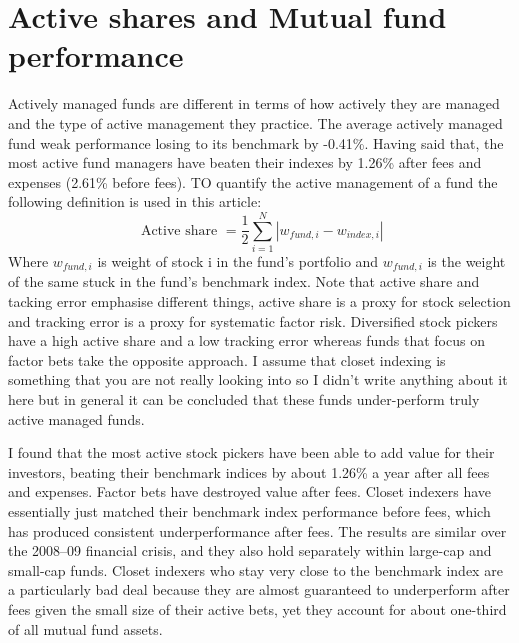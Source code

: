 \documentclass[12 pt]{article}
\begin{document}
\section{Active shares and Mutual fund performance}
Actively managed funds are different in terms of how actively they are managed and the type of active management they practice. The average actively managed fund weak performance losing to its benchmark by -0.41\%. Having said that, the most active fund managers have beaten their indexes by 1.26\% after fees and expenses (2.61\% before fees). TO quantify the active management of a fund the following definition is used in this article: 
\[
\text{ Active share } = \frac{1}{2}\sum_{i=1}^N\left|w_{fund, i}-w_{index, i}\right|
\]
Where $w_{fund, i}$ is weight of stock i in the fund's portfolio and $w_{fund, i}$ is the weight of the same stuck in the fund's benchmark index.
Note that active share and tacking error emphasise different things, active share is a proxy for stock selection and tracking error is a proxy for systematic factor risk. Diversified stock pickers have a high active share and a low tracking error whereas funds that focus on factor bets take the opposite approach. 	I assume that closet indexing is something that you are not really looking into so I didn't write anything about it here but in general it can be concluded that these funds under-perform truly active managed funds. 
\par I found that the most active stock pickers have been able to add value for their investors, beating their benchmark indices by about 1.26\% a year after all fees and expenses. Factor bets have destroyed value after fees. Closet indexers have essentially just matched their benchmark index performance before fees, which has produced consistent underperformance after fees. The results are similar over the 2008–09 financial crisis, and they also hold separately within large-cap and small-cap funds. Closet indexers who stay very close to the benchmark index are a particularly bad deal because they are almost guaranteed to underperform after fees given the small size of their active bets, yet they account for about one-third of all mutual fund assets.
\end{document}
